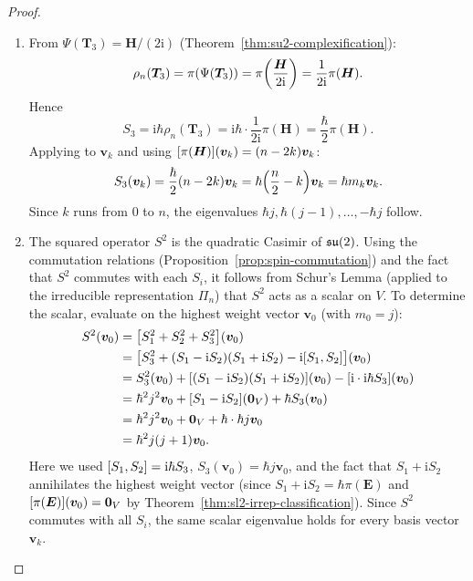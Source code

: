 \documentclass[11pt,reqno]{amsart}
\newcommand{\ii}{\mathrm{i}}
\begin{document}
\begin{proof}
\begin{enumerate}
\item From $\Psi(\bm T_3)=\bm H/(2\ii)$
(Theorem~\ref{thm:su2-complexification}):
\[
\rho_n(\bm T_3)=\pi\Br{\Psi(\bm T_3)}
=\pi\Br{\frac{\bm H}{2\ii}}=\frac{1}{2\ii}\pi(\bm H).
\]
Hence
\[
S_3=\ii\hbar\rho_n(\bm T_3)
=\ii\hbar\cdot\frac{1}{2\ii}\pi(\bm H)
=\frac{\hbar}{2}\pi(\bm H).
\]
Applying to $\bm v_k$ and using
$\FUNC{\pi(\bm H)}{\bm v_k}=(n-2k)\bm v_k$:
\[
S_3(\bm v_k)
=\frac{\hbar}{2}(n-2k)\bm v_k
=\hbar\Br{\frac{n}{2}-k}\bm v_k
=\hbar m_k\bm v_k.
\]
Since $k$ runs from $0$ to $n$, the eigenvalues
$\hbar j,\hbar(j-1),\dots,-\hbar j$ follow.

\item The squared operator $S^2$ is the quadratic Casimir of
$\mathfrak{su}(2)$.  Using the commutation relations
(Proposition~\ref{prop:spin-commutation}) and the fact that
$S^2$ commutes with each $S_i$, it follows from Schur's
Lemma (applied to the irreducible representation $\Pi_n$) that
$S^2$ acts as a scalar on $V$.
To determine the scalar, evaluate on the highest weight vector
$\bm v_0$ (with $m_0=j$):
\[
\begin{aligned}
S^2(\bm v_0)
&=\FUNC{S_1^2+S_2^2+S_3^2}{\bm v_0} \\
&=\FUNC{S_3^2+(S_1-\ii S_2)(S_1+\ii S_2)
-\ii\SqBr{S_1,S_2}}{\bm v_0} \\
&=S_3^2(\bm v_0)
+\FUNC{(S_1-\ii S_2)(S_1+\ii S_2)}{\bm v_0}
-\FUNC{\ii\cdot\ii\hbar S_3}{\bm v_0} \\
&=\hbar^2 j^2\bm v_0
+\FUNC{S_1-\ii S_2}{\bm0_V}
+\hbar S_3(\bm v_0) \\
&=\hbar^2 j^2\bm v_0+\bm0_V+\hbar\cdot\hbar j\bm v_0\\
&=\hbar^2 j(j+1)\bm v_0.
\end{aligned}
\]
Here we used
$\SqBr{S_1,S_2}=\ii\hbar S_3$,
$S_3(\bm v_0)=\hbar j\bm v_0$, and the fact that
$S_1+\ii S_2$ annihilates the highest weight vector
(since $S_1+\ii S_2=\hbar\pi(\bm E)$ and
$\FUNC{\pi(\bm E)}{\bm{v}_0}=\bm0_V$ by
Theorem~\ref{thm:sl2-irrep-classification}).
Since $S^2$ commutes with all $S_i$, the same scalar
eigenvalue holds for every basis vector $\bm v_k$.
\end{enumerate}
\end{proof}
\end{document}
